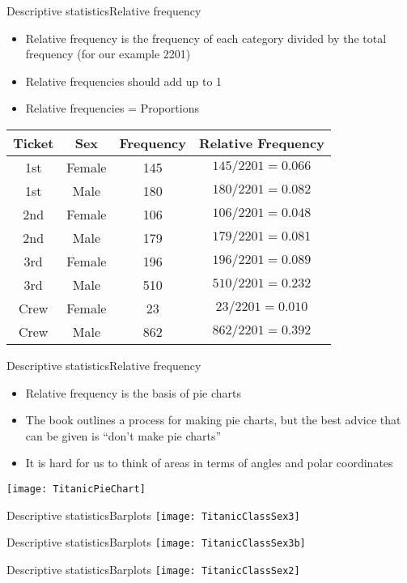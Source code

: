 \documentclass[xcolor=dvipsnames]{beamer}
\begin{document}
\begin{frame}{Descriptive statistics}{Relative frequency}
	\begin{itemize}
		\item Relative frequency is the frequency of each category divided by the total frequency (for our example 2201)
		\item Relative frequencies should add up to 1
		\item Relative frequencies = Proportions
	\end{itemize}
	\begin{center}
			\begin{tabular}{|c|c|c|c|}
			\hline
			\textbf{Ticket} & \textbf{Sex} & \textbf{Frequency} & \textbf{Relative Frequency}\\
			\hline \hline
			1st & Female & 145 & $145 / 2201 = 0.066$\\
			\hline
			1st &  Male & 180 & $180 / 2201 = 0.082$\\
			\hline
			2nd & Female & 106 & $106 / 2201 = 0.048$\\
			\hline
			2nd  & Male & 179 & $179 / 2201 = 0.081$\\
			\hline
			3rd & Female & 196 & $196 / 2201 = 0.089$\\
			\hline
			3rd  & Male & 510 & $510 / 2201 = 0.232$\\
			\hline
			Crew & Female &  23 & $23 / 2201 = 0.010$\\
			\hline
			Crew  & Male & 862 & $862 / 2201 = 0.392$\\
			\hline
		\end{tabular}
	\end{center}
\end{frame}

\begin{frame}{Descriptive statistics}{Relative frequency}
\begin{itemize}
	\item Relative frequency is the basis of pie charts
	\item The book outlines a process for making pie charts, but the best advice that can be given is ``don't make pie charts''
	\item It is hard for us to think of areas in terms of angles and polar coordinates
\end{itemize}
\begin{center}
	\texttt{[image: TitanicPieChart]}
\end{center}
\end{frame}

\begin{frame}{Descriptive statistics}{Barplots}
\texttt{[image: TitanicClassSex3]}
\end{frame}

\begin{frame}{Descriptive statistics}{Barplots}
\texttt{[image: TitanicClassSex3b]}
\end{frame}

\begin{frame}{Descriptive statistics}{Barplots}
\texttt{[image: TitanicClassSex2]}
\end{frame}
\end{document}
